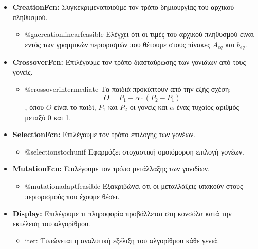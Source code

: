 \documentclass[twocolumn]{report}
\begin{document}
\begin{itemize}
    \item {}\textbf{CreationFcn:} 
    Συγκεκριμενοποιούμε τον τρόπο δημιουργίας του αρχικού πληθυσμού. 
    \begin{itemize}    
        \item {}@gacreationlinearfeasible
        Ελέγχει ότι οι τιμές του αρχικού πληθυσμού είναι εντός των γραμμικών περιορισμών
        που θέτουμε στους πίνακες $A_{eq}$ και $b_{eq}$.
    \end{itemize}

    \item {}\textbf{CrossoverFcn:} 
    Επιλέγουμε τον τρόπο διασταύρωσης των γονιδίων από τους γονείς.
    \begin{itemize}
        \item {}@crossoverintermediate
        Τα παιδιά προκύπτουν από την εξής σχέση: $$ O = P_1 + \alpha \cdot (P_2 - P_1) $$,
        όπου $O$ είναι το παιδί, $P_1$ και $P_2$ οι γονείς και $\alpha$ ένας τυχαίος αριθμός
        μεταξύ 0 και 1.
    \end{itemize}

    \item {}\textbf{SelectionFcn:} 
    Επιλέγουμε τον τρόπο επιλογής των γονέων.
    \begin{itemize}
        \item {}@selectionstochunif
        Εφαρμόζει στοχαστική ομοιόμορφη επιλογή γονέων.
    \end{itemize}

    \item {}\textbf{MutationFcn:}
    Επιλέγουμε τον τρόπο μετάλλαξης των γονιδίων.
    \begin{itemize}
        \item {}@mutationadaptfeasible
        Εξακριβώνει ότι οι μεταλλάξεις υπακούν στους περιορισμούς που έχουμε θέσει.
    \end{itemize}

    \item {}\textbf{Display:}
    Επιλέγουμε τι πληροφορία προβάλλεται στη κονσόλα κατά την εκτέλεση του αλγορίθμου.
    \begin{itemize}
        \item {}iter:
        Τυπώνεται η αναλυτική εξέλιξη του αλγορίθμου κάθε γενιά.
    \end{itemize}


\end{itemize}
\end{document}
